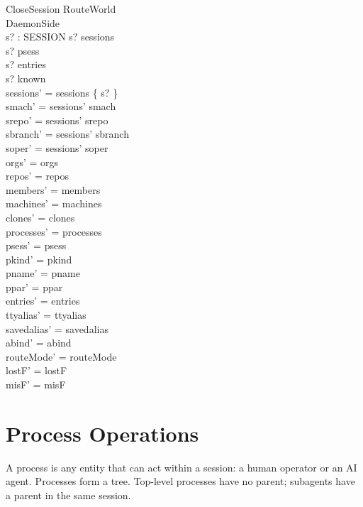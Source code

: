 \documentclass[a4paper,10pt,fleqn]{article}
\begin{document}
\begin{schema}{CloseSession}
  \Delta RouteWorld \\
  \Xi DaemonSide \\
  s? : SESSION
  \where
  s? \in sessions \\
  s? \notin \ran psess \\
  s? \notin entries \\
  s? \notin known \\
  sessions' = sessions \setminus \{ s? \} \\
  smach' = sessions' \dres smach \\
  srepo' = sessions' \dres srepo \\
  sbranch' = sessions' \dres sbranch \\
  soper' = sessions' \dres soper \\
  orgs' = orgs \\
  repos' = repos \\
  members' = members \\
  machines' = machines \\
  clones' = clones \\
  processes' = processes \\
  psess' = psess \\
  pkind' = pkind \\
  pname' = pname \\
  ppar' = ppar \\
  entries' = entries \\
  ttyalias' = ttyalias \\
  savedalias' = savedalias \\
  abind' = abind \\
  routeMode' = routeMode \\
  lostF' = lostF \\
  misF' = misF
\end{schema}

\section{Process Operations}

A process is any entity that can act within a session: a human operator
or an AI agent.  Processes form a tree.  Top-level processes have no
parent; subagents have a parent in the same session.

\end{document}
